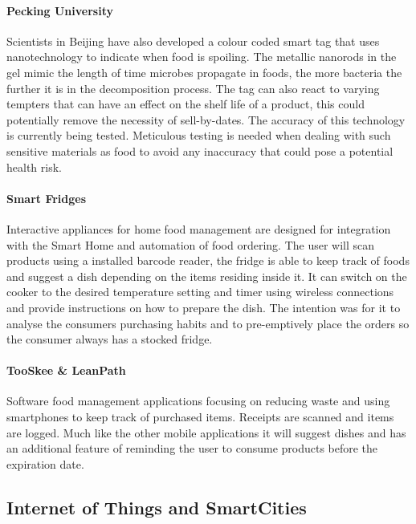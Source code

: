 \documentclass[a4paper, 11pt]{article}
\begin{document}
\paragraph{Pecking University}Scientists in Beijing have also developed a colour coded smart tag that uses nanotechnology to indicate when food is spoiling. The metallic nanorods in the gel mimic the length of time microbes propagate in foods, the more bacteria the further it is in the decomposition process. The tag can also react to varying tempters that can have an effect on the shelf life of a product, this could potentially remove the necessity of sell-by-dates. The accuracy of this technology is currently being tested. Meticulous testing is needed when dealing with such sensitive materials as food to avoid any inaccuracy that could pose a potential health risk.

\paragraph{Smart Fridges} Interactive appliances for home food management are designed for integration with the Smart Home and automation of food ordering. The user will scan products using a installed barcode reader, the fridge is able to keep track of foods and suggest a dish depending on the items residing inside it. It can switch on the cooker to the desired temperature setting and timer using wireless connections and provide instructions on how to prepare the dish. The intention was for it to analyse the consumers purchasing habits and to pre-emptively place the orders so the consumer always has a stocked fridge. 

\paragraph{TooSkee \& LeanPath} Software food management applications focusing on reducing waste and using smartphones to keep track of purchased items. Receipts are scanned and items are logged. Much like the other mobile applications it will suggest dishes and has an additional feature of reminding the user to consume products before the expiration date.		

\vspace{\baselineskip}
\vspace{\baselineskip}
\vspace{\baselineskip}


\subsection{Internet of Things and SmartCities}
\end{document}
